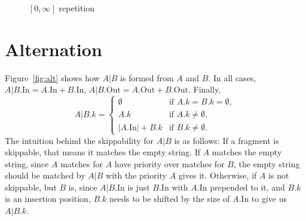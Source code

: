 \documentclass{article}
\newcommand*{\In}{\mathrm{In}}
\newcommand*{\Out}{\mathrm{Out}}
\begin{document}
\begin{figure}
{%
}
\caption{$[0,\infty]$ repetition\label{fig:star}}
\end{figure}

\section{Alternation}

Figure~\ref{fig:alt} shows how $A|B$ is formed from $A$ and $B$. In all cases, $A|B.\In = A.\In + B.\In$, $A|B.\Out = A.\Out + B.\Out$. Finally,
\[ A|B.k = \begin{cases}
  \emptyset & \text{if } A.k = B.k = \emptyset,\\
  A.k       & \text{if } A.k \ne \emptyset,\\
  \lvert A.\In\rvert + B.k & \text{if } B.k \ne \emptyset.
\end{cases}\]
The intuition behind the skippability for $A|B$ is as follows: If a fragment is skippable, that means it matches the empty string. If $A$ matches the empty string, since $A$ matches for $A$ have priority over matches for $B$, the empty string should be matched by $A|B$ with the priority $A$ gives it. Otherwise, if $A$ is not skippable, but $B$ is, since $A|B.\In$ is just $B.\In$ with $A.\In$ prepended to it, and $B.k$ is an insertion position, $B.k$ needs to be shifted by the size of $A.\In$ to give us $A|B.k$.
\end{document}
